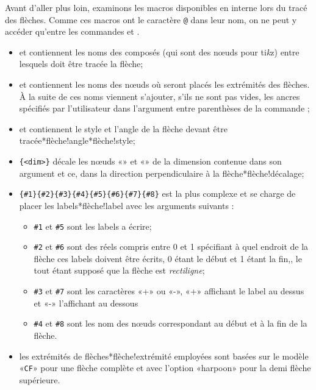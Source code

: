\documentclass[10pt]{article}
\makeatletter
\newcommand\idx{\@ifstar{\let\print@or@not\@gobble\idx@}{\let\print@or@not\@firstofone\idx@}}
\newcommand\idx@[1]{%
	\ifcat\expandafter\noexpand\@car#1\@nil\relax%
		\expandafter\ifx\@car#1\@nil\protect
			\index{#1}%
			\print@or@not{#1}%
		\else
			\saveexpandmode\expandarg
			\StrSubstitute{\string#1}{\string @}{\@empty\protect\symbol{'100}}[\temp@]%
			\StrGobbleLeft\temp@1[\temp@]%
			\restoreexpandmode
			\expandafter\index\expandafter{\temp@ @\protect\texttt{\protect\textbackslash\temp@}}%
			\print@or@not{\texttt{\string#1}}%
		\fi
	\else
		\index{#1}%
		\print@or@not{#1}%
	\fi
}
\newcommand\TIKZ{ti\textit kz\xspace}
\makeatother
\begin{document}
Avant d'aller plus loin, examinons les macros disponibles en interne lors du tracé des flèches. Comme ces macros ont le caractère \verb-@- dans leur nom, on ne peut y accéder qu'entre les commandes \idx{\makeatletter} et \idx{\makeatother}.
\begin{itemize}
	\item \idx{\CF@arrow@start@name} et \idx{\CF@arrow@end@name} contiennent les noms des composés (qui sont des nœuds pour \TIKZ) entre lesquels doit être tracée la flèche;
	\item \idx{\CF@arrow@start@node} et \idx{\CF@arrow@end@node} contiennent les noms des nœuds où seront placés les extrémités des flèches. À la suite de ces noms viennent s'ajouter, s'ils ne sont pas vides, les ancres spécifiés par l'utilisateur dans l'argument entre parenthèses de la commande \idx\arrow;
	\item \idx{\CF@arrow@current@style} et \idx{\CF@arrow@current@angle} contiennent le style et l'angle de la flèche devant être tracée\idx*{flèche!angle}\idx*{flèche!style};
	\item \idx{\CF@arrow@shift@nodes}\verb-{<dim>}- décale les nœuds «\idx{\CF@arrow@start@node}» et «\idx{\CF@arrow@end@node}» de la dimension contenue dans son argument et ce, dans la direction perpendiculaire à la flèche\idx*{flèche!décalage};
	\item \idx{\CF@arrow@display@label}\verb/{#1}{#2}{#3}{#4}{#5}{#6}{#7}{#8}/ est la plus complexe et se charge de placer les labels\idx*{flèche!label} avec les arguments suivants :
	\begin{itemize}
		\item \verb-#1- et \verb-#5- sont les labels a écrire;
		\item \verb-#2- et \verb-#6- sont des réels compris entre 0 et 1 spécifiant à quel endroit de la flèche ces labels doivent être écrits, 0 étant le début et 1 étant la fin,, le tout étant supposé que la flèche est \emph{rectiligne};
		\item \verb-#3- et \verb-#7- sont les caractères «+» ou «-», «+» affichant le label au dessus et «-» l'affichant au dessous
		\item \verb-#4- et \verb-#8- sont les nom des nœuds correspondant au début et à la fin de la flèche.
	\end{itemize}
	\item les extrémités de flèches\idx*{flèche!extrémité} employées sont basées sur le modèle «\verb-CF-» pour une flèche complète et avec l'option «harpoon» pour la demi flèche supérieure.
\end{itemize}
\end{document}
